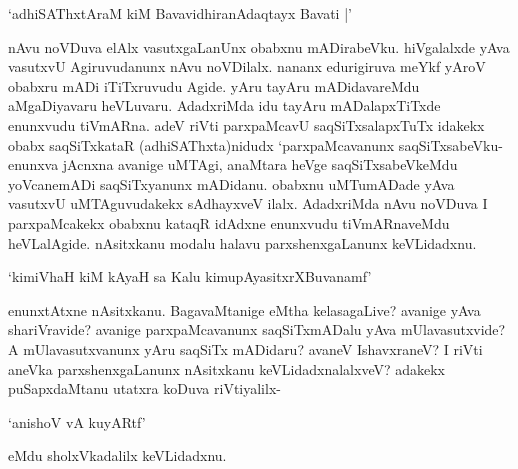 \begin{shloka}
`adhiSAThxtAraM kiM BavavidhiranAdaqtayx Bavati |'
\end{shloka}

nAvu noVDuva elAlx vasutxgaLanUnx obabxnu mADirabeVku. hiVgalalxde yAva vasutxvU Agiruvudanunx nAvu noVDilalx. nananx edurigiruva meYkf yAroV obabxru mADi iTiTxruvudu Agide. yAru tayAru mADidavareMdu aMgaDiyavaru heVLuvaru. AdadxriMda idu tayAru mADalapxTiTxde enunxvudu tiVmARna. adeV riVti parxpaMcavU saqSiTxsalapxTuTx idakekx obabx saqSiTxkataR (adhiSAThxta)nidudx `parxpaMcavanunx saqSiTxsabeVku- enunxva jAcnxna avanige uMTAgi, anaMtara heVge saqSiTxsabeVkeMdu yoVcanemADi saqSiTxyanunx mADidanu. obabxnu uMTumADade yAva vasutxvU uMTAguvudakekx sAdhayxveV ilalx. AdadxriMda nAvu noVDuva I parxpaMcakekx obabxnu kataqR idAdxne enunxvudu tiVmARnaveMdu heVLalAgide. nAsitxkanu modalu halavu parxshenxgaLanunx keVLidadxnu.

\begin{shloka}
`kimiVhaH kiM kAyaH sa Kalu kimupAyasitxrXBuvanamf'
\end{shloka}

enunxtAtxne nAsitxkanu. BagavaMtanige eMtha kelasagaLive? avanige yAva shariVravide? avanige parxpaMcavanunx saqSiTxmADalu yAva mUlavasutxvide? A mUlavasutxvanunx yAru saqSiTx mADidaru? avaneV IshavxraneV? I riVti aneVka parxshenxgaLanunx nAsitxkanu keVLidadxnalalxveV? adakekx puSapxdaMtanu utatxra koDuva riVtiyalilx-

\begin{shloka}
`anishoV vA kuyARtf'
\end{shloka}

eMdu sholxVkadalilx keVLidadxnu.

